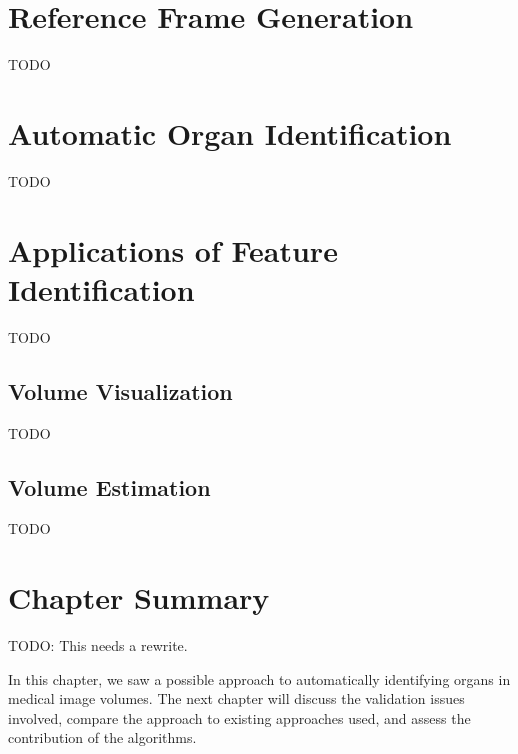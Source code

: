 \section{Reference Frame Generation}

TODO

\section{Automatic Organ Identification}

TODO

\section{Applications of Feature Identification}
\label{sec:featureid-applications}

TODO

\subsection{Volume Visualization}

TODO

\subsection{Volume Estimation}

TODO

\section{Chapter Summary}

TODO: This needs a rewrite.

In this chapter, we saw a possible approach to automatically identifying organs in medical image volumes. The next chapter will discuss the validation issues involved, compare the approach to existing approaches used, and assess the contribution of the algorithms.
